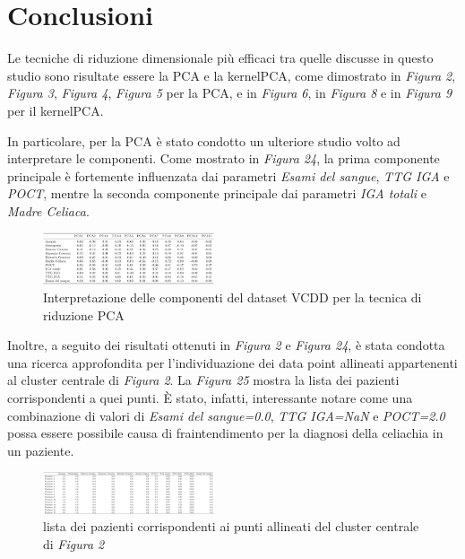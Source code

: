 \documentclass[11pt,a4paper,twocolumn]{article}
\begin{document}
\section{Conclusioni}
Le tecniche di riduzione dimensionale più efficaci tra quelle discusse in questo studio sono risultate essere la PCA e la kernelPCA, come dimostrato in \emph{Figura 2}, \emph{Figura 3}, \emph{Figura 4}, \emph{Figura 5} per la PCA, e in \emph{Figura 6}, in \emph{Figura 8} e in \emph{Figura 9} per il kernelPCA. \par

In particolare, per la PCA è stato condotto un ulteriore studio volto ad interpretare le componenti. Come mostrato in \emph{Figura 24}, la prima componente principale è fortemente influenzata dai parametri \emph{Esami del sangue}, \emph{TTG IGA} e \emph{POCT}, mentre la seconda componente principale dai parametri \emph{IGA totali} e \emph{Madre Celiaca}.

\begin{figure}[H]
	\centering
	\includegraphics[width=0.45\textwidth]{img/PCA_components_interpretation.png}
	\caption{Interpretazione delle componenti del dataset VCDD per la tecnica di riduzione PCA}
\end{figure}

Inoltre, a seguito dei risultati ottenuti in \emph{Figura 2} e \emph{Figura 24}, è stata condotta una ricerca approfondita per l'individuazione dei data point allineati appartenenti al cluster centrale di \emph{Figura 2}. La \emph{Figura 25} mostra la lista dei pazienti corrispondenti a quei punti. È stato, infatti, interessante notare come una combinazione di valori di \emph{Esami del sangue=0.0}, \emph{TTG IGA=NaN} e \emph{POCT=2.0} possa essere possibile causa di fraintendimento per la diagnosi della celiachia in un paziente.

\begin{figure}[H]
	\centering
	\includegraphics[width=0.45\textwidth]{img/pazientiFiltrati.png}
	\caption{lista dei pazienti corrispondenti ai punti allineati del cluster centrale di \emph{Figura 2}}
\end{figure}
\end{document}
